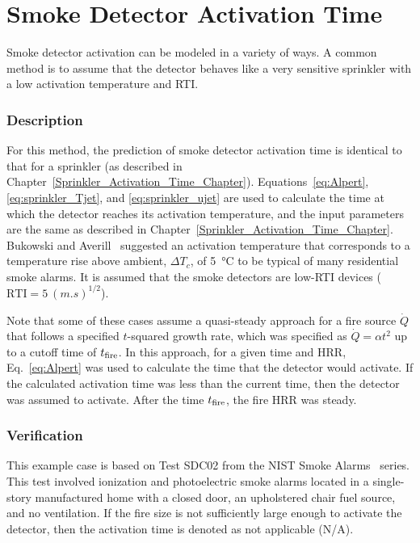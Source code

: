 
\chapter{Smoke Detector Activation Time}
\label{Smoke_Detector_Activation_Time_Chapter}

Smoke detector activation can be modeled in a variety of ways. A common method is to assume that the detector behaves like a very sensitive sprinkler with a low activation temperature and RTI.

\subsection*{Description}

For this method, the prediction of smoke detector activation time is identical to that for a sprinkler (as described in Chapter~\ref{Sprinkler_Activation_Time_Chapter}). Equations~\ref{eq:Alpert}, \ref{eq:sprinkler_Tjet}, and \ref{eq:sprinkler_ujet} are used to calculate the time at which the detector reaches its activation temperature, and the input parameters are the same as described in Chapter~\ref{Sprinkler_Activation_Time_Chapter}. Bukowski and Averill~\cite{Bukowski:2} suggested an activation temperature that corresponds to a temperature rise above ambient, $\Delta T_c$, of \SI{5}{\celsius} to be typical of many residential smoke alarms. It is assumed that the smoke detectors are low-RTI devices ($\textrm{RTI}=5~\si{(m.s)^{1/2}}$).

Note that some of these cases assume a quasi-steady approach for a fire source $\dot Q$ that follows a specified $t$-squared growth rate, which was specified as $\dot Q = \alpha t^2$ up to a cutoff time of $t\sb{fire}$. In this approach, for a given time and HRR, Eq.~\ref{eq:Alpert} was used to calculate the time that the detector would activate. If the calculated activation time was less than the current time, then the detector was assumed to activate. After the time $t\sb{fire}$, the fire HRR was steady.


\clearpage


\subsection*{Verification}

This example case is based on Test SDC02 from the NIST Smoke Alarms~\cite{Bukowski:1} series. This test involved ionization and photoelectric smoke alarms located in a single-story manufactured home with a closed door, an upholstered chair fuel source, and no ventilation. If the fire size is not sufficiently large enough to activate the detector, then the activation time is denoted as not applicable (N/A).

